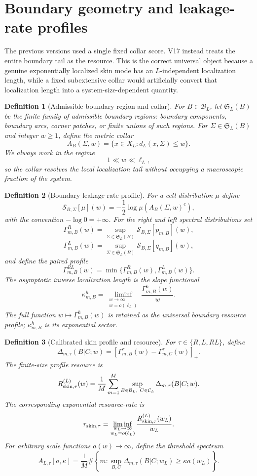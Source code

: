 \documentclass[11pt]{article}
\newtheorem{definition}{Definition}
\newcommand{\calB}{\mathcal B}
\newcommand{\calC}{\mathcal C}
\begin{document}
\section{Boundary geometry and leakage-rate profiles}
\label{sec:boundary}

The previous versions used a single fixed collar score. V17 instead treats the entire
boundary tail as the resource. This is the correct universal object because a genuine
exponentially localized skin mode has an $L$-independent localization length, while a
fixed subextensive collar would artificially convert that localization length into a
system-size-dependent quantity.

\begin{definition}[Admissible boundary region and collar]
For $B\in\calB_L$, let $\mathfrak S_L(B)$ be the finite family of admissible boundary
regions: boundary components, boundary arcs, corner patches, or finite unions of such
regions. For $\Sigma\in\mathfrak S_L(B)$ and integer $w\ge1$, define the metric collar
\[
A_B(\Sigma,w)=\{x\in X_L:d_L(x,\Sigma)\le w\}.
\]
We always work in the regime
\[
1\ll w\ll\ell_L,
\]
so the collar resolves the local localization tail without occupying a macroscopic
fraction of the system.
\end{definition}

\begin{definition}[Boundary leakage-rate profile]
For a cell distribution $\mu$ define
\[
\mathcal S_{B,\Sigma}[\mu](w)
=-\frac12\log \mu(A_B(\Sigma,w)^c),
\]
with the convention $-\log0=+\infty$. For the right and left spectral distributions
set
\[
\Gamma_{m,B}^{R}(w)=
\sup_{\Sigma\in\mathfrak S_L(B)}
\mathcal S_{B,\Sigma}[p_{m,B}](w),
\]
\[
\Gamma_{m,B}^{L}(w)=
\sup_{\Sigma\in\mathfrak S_L(B)}
\mathcal S_{B,\Sigma}[q_{m,B}](w),
\]
and define the paired profile
\[
\Gamma_{m,B}^{RL}(w)=
\min\{\Gamma_{m,B}^{R}(w),\Gamma_{m,B}^{L}(w)\}.
\]
The asymptotic inverse localization length is the slope functional
\[
\kappa_{m,B}^{h}
=
\liminf_{\substack{w\to\infty\\w=o(\ell_L)}}
\frac{\Gamma_{m,B}^{h}(w)}{w}.
\]
The full function $w\mapsto\Gamma_{m,B}^{h}(w)$ is retained as the universal boundary
resource profile; $\kappa_{m,B}^{h}$ is its exponential sector.
\end{definition}

\begin{definition}[Calibrated skin profile and resource]
For $\tau\in\{R,L,RL\}$, define
\[
\Delta_{m,\tau}(B|C;w)
=
[\Gamma_{m,B}^{\tau}(w)-\Gamma_{m,C}^{\tau}(w)]_+.
\]
The finite-size profile resource is
\[
R_{\rm skin,\tau}^{(L)}(w)
=\frac1M\sum_{m=1}^{M}
\sup_{B\in\calB_L,\ C\in\calC_L}
\Delta_{m,\tau}(B|C;w).
\]
The corresponding exponential resource-rate is
\[
r_{\rm skin,\tau}
=\liminf_{\substack{w_L\to\infty\\w_L=o(\ell_L)}}
\frac{R_{\rm skin,\tau}^{(L)}(w_L)}{w_L}.
\]
For arbitrary scale functions $a(w)\to\infty$, define the threshold spectrum
\[
A_{L,\tau}[a,\kappa]
=\frac1M\#\left\{
 m:
\sup_{B,C}\Delta_{m,\tau}(B|C;w_L)
\ge\kappa a(w_L)
\right\}.
\]
\end{definition}
\end{document}
